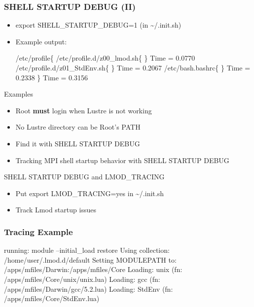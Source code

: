 \documentclass{beamer}
\begin{document}
\begin{frame}[fragile]
    \frametitle{SHELL STARTUP DEBUG (II)}
  \begin{itemize}
    \item export SHELL\_STARTUP\_DEBUG=1 (in \textasciitilde/.init.sh)
    \item Example output:
  {\small
    \begin{semiverbatim}
    /etc/profile\{
      /etc/profile.d/z00\_lmod.sh\{
      \} Time = 0.0770
      /etc/profile.d/z01\_StdEnv.sh\{
      \} Time = 0.2067
      /etc/bash.bashrc\{
      \} Time = 0.2338
    \} Time = 0.3156
    \end{semiverbatim}
}
  \end{itemize}
\end{frame}

\begin{frame}{Examples}
  \begin{itemize}
    \item Root \textbf{must} login when Lustre is not working
    \item No Lustre directory can be Root's PATH
    \item Find it with SHELL STARTUP DEBUG
    \item Tracking MPI shell startup behavior with SHELL STARTUP DEBUG
  \end{itemize}
\end{frame}

\begin{frame}{SHELL STARTUP DEBUG and LMOD\_TRACING}
  \begin{itemize}
    \item Put export LMOD\_TRACING=yes in \textasciitilde/.init.sh
    \item Track Lmod startup issues
  \end{itemize}
\end{frame}


\begin{frame}[fragile]
    \frametitle{Tracing Example}
  {\tiny
    \begin{semiverbatim}
running: module --initial\_load restore
  Using collection:      /home/user/.lmod.d/default
  Setting MODULEPATH to: /apps/mfiles/Darwin:/apps/mfiles/Core
  Loading: unix (fn: /apps/mfiles/Core/unix/unix.lua)
  Loading: gcc (fn: /apps/mfiles/Darwin/gcc/5.2.lua)
  Loading: StdEnv (fn: /apps/mfiles/Core/StdEnv.lua)
    \end{semiverbatim}
}
\end{frame}
\end{document}

